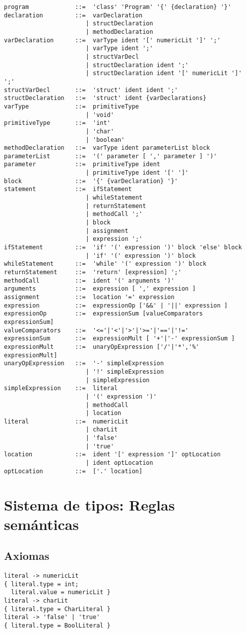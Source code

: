 \documentclass[12pt,letterpaper]{article}
\begin{document}
\begin{lstlisting}
program             ::=  'class' 'Program' '{' {declaration} '}'
declaration         ::=  varDeclaration
                       | structDeclaration 
                       | methodDeclaration
varDeclaration      ::=  varType ident '[' numericLit ']' ';'
                       | varType ident ';'
                       | structVarDecl
                       | structDeclaration ident ';'
                       | structDeclaration ident '[' numericLit ']' ';'
structVarDecl       ::=  'struct' ident ident ';'
structDeclaration   ::=  'struct' ident {varDeclarations}
varType             ::=  primitiveType 
                       | 'void'
primitiveType       ::=  'int' 
                       | 'char'
                       | 'boolean'
methodDeclaration   ::=  varType ident parameterList block
parameterList       ::=  '(' parameter [ ',' parameter ] ')'
parameter           ::=  primitiveType ident
                       | primitiveType ident '[' ']'
block               ::=  '{' {varDeclaration} '}'
statement           ::=  ifStatement 
                       | whileStatement
                       | returnStatement
                       | methodCall ';'
                       | block
                       | assignment
                       | expression ';'
ifStatement         ::=  'if' '(' expression ')' block 'else' block
                       | 'if' '(' expression ')' block                       
whileStatement      ::=  'while' '(' expression ')' block
returnStatement     ::=  'return' [expression] ';'
methodCall          ::=  ident '(' arguments ')'
arguments           ::=  expression [ ',' expression ]
assignment          ::=  location '=' expression
expression          ::=  expressionOp ['&&' | '||' expression ]
expressionOp        ::=  expressionSum [valueComparators expressionSum]
valueComparators    ::=  '<='|'<'|'>'|'>='|'=='|'!='
expressionSum       ::=  expressionMult [ '+'|'-' expressionSum ]
expressionMult      ::=  unaryOpExpression ['/'|'*','%' expressionMult]
unaryOpExpression   ::=  '-' simpleExpression 
                       | '!' simpleExpression
                       | simpleExpression
simpleExpression    ::=  literal
                       | '(' expression ')'
                       | methodCall
                       | location
literal             ::=  numericLit 
                       | charLit 
                       | 'false' 
                       | 'true'
location            ::=  ident '[' expression ']' optLocation
                       | ident optLocation
optLocation         ::=  ['.' location]
\end{lstlisting}

\section*{Sistema de tipos: Reglas sem\'{a}nticas}
\subsection*{Axiomas}
\begin{lstlisting}
literal -> numericLit
{ literal.type = int;
  literal.value = numericLit }
literal -> charLit
{ literal.type = CharLiteral }
literal -> 'false' | 'true'
{ literal.type = BoolLiteral }
\end{lstlisting}
\end{document}
